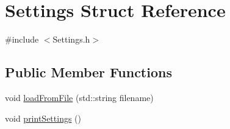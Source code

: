 \hypertarget{structSettings}{}\section{Settings Struct Reference}
\label{structSettings}


{\ttfamily \#include $<$Settings.\+h$>$}

\subsection*{Public Member Functions}
\begin{DoxyCompactItemize}
\item 
void \mbox{\hyperlink{structSettings_a55f95e3b6e7379bef4f8399a2cd670cc}{load\+From\+File}} (std\+::string filename)
\item 
void \mbox{\hyperlink{structSettings_a68ce38117dcef2cbdd3bd17f127b3078}{print\+Settings}} ()
\end{DoxyCompactItemize}

